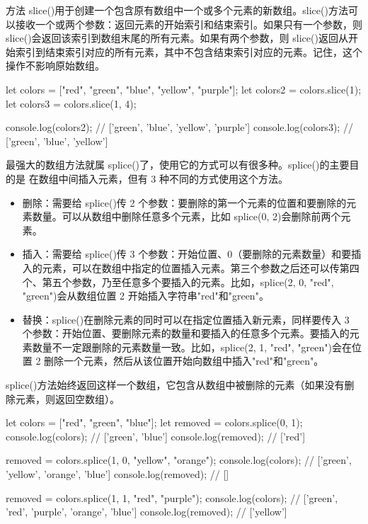 方法 slice()用于创建一个包含原有数组中一个或多个元素的新数组。slice()方法可以接收一个或两个参数：返回元素的开始索引和结束索引。如果只有一个参数，则 slice()会返回该索引到数组末尾的所有元素。如果有两个参数，则 slice()返回从开始索引到结束索引对应的所有元素，其中不包含结束索引对应的元素。记住，这个操作不影响原始数组。

\begin{js}
let colors = ["red", "green", "blue", "yellow", "purple"];
let colors2 = colors.slice(1);
let colors3 = colors.slice(1, 4);

console.log(colors2); // ['green', 'blue', 'yellow', 'purple']
console.log(colors3); // ['green', 'blue', 'yellow']
\end{js}

最强大的数组方法就属 splice()了，使用它的方式可以有很多种。splice()的主要目的是
在数组中间插入元素，但有 3 种不同的方式使用这个方法。
\begin{itemize}
    \item 删除：需要给 splice()传 2 个参数：要删除的第一个元素的位置和要删除的元素数量。可以从数组中删除任意多个元素，比如 splice(0, 2)会删除前两个元素。
    \item 插入：需要给 splice()传 3 个参数：开始位置、0（要删除的元素数量）和要插入的元素，可以在数组中指定的位置插入元素。第三个参数之后还可以传第四个、第五个参数，乃至任意多个要插入的元素。比如，splice(2, 0, "red", "green")会从数组位置 2 开始插入字符串"red"和"green"。
    \item 替换：splice()在删除元素的同时可以在指定位置插入新元素，同样要传入 3 个参数：开始位置、要删除元素的数量和要插入的任意多个元素。要插入的元素数量不一定跟删除的元素数量一致。比如，splice(2, 1, "red", "green")会在位置 2 删除一个元素，然后从该位置开始向数组中插入"red"和"green"。
\end{itemize}

splice()方法始终返回这样一个数组，它包含从数组中被删除的元素（如果没有删除元素，则返回空数组）。

\begin{js}
let colors = ["red", "green", "blue"];
let removed = colors.splice(0, 1);
console.log(colors); // ['green', 'blue']
console.log(removed); // ['red']

removed = colors.splice(1, 0, "yellow", "orange");
console.log(colors); // ['green', 'yellow', 'orange', 'blue']
console.log(removed); // []

removed = colors.splice(1, 1, "red", "purple");
console.log(colors); // ['green', 'red', 'purple', 'orange', 'blue']
console.log(removed); // ['yellow']
\end{js}

